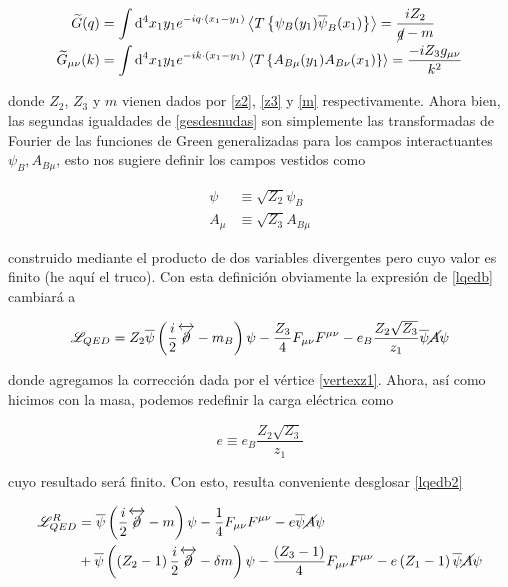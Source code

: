 \documentclass[tickz]{article}
\numberwithin{equation}{section}
\begin{document}
\begin{equation}\label{gesdesnudas}
\begin{aligned}
\widetilde{G}(q) &=\int \mathrm{d^4}x_1y_1 e^{-iq\cdot( x_1 - y_1)}\left\langle T\left\{ \psi_B(y_1)\overline{\psi}_B(x_1)\right\} \right\rangle = \frac{iZ_2}{\cancel{q}-m}\\
 \widetilde{G}_{\mu\nu}(k)&=\int \mathrm{d^4}x_1y_1 e^{-ik\cdot( x_1 - y_1)}\left\langle T\left\{ A_{B\mu}(y_1)A_{B\nu}(x_1)\right\}\right\rangle =\frac{-iZ_3g_{\mu\nu}}{k^2}
\end{aligned}
\end{equation}

donde $ Z_2 $, $ Z_3 $ y $ m $ vienen dados por \ref{z2}, \ref{z3} y \ref{m} respectivamente. Ahora bien, las segundas igualdades de \ref{gesdesnudas} son simplemente las transformadas de Fourier de las funciones de Green generalizadas para los campos interactuantes $ \psi_B, A_{B\mu} $, esto nos sugiere definir los campos vestidos como

\begin{equation}\label{key}
\begin{aligned}
\psi &\equiv \sqrt{Z_2}\psi_B\\
A_{\mu} &\equiv \sqrt{Z_3} A_{B\mu}
\end{aligned}
\end{equation}

construido mediante el producto de dos variables divergentes pero cuyo valor es finito (he aquí el truco). Con esta definición obviamente la expresión de \ref{lqedb} cambiará a 

\begin{equation}\label{lqedb2}
\mathscr{L}_{QED}=Z_2\overline{\psi}\left(\frac{i}{2}
\overleftrightarrow{\cancel{\partial}}-m_B\right)\psi-\frac{Z_3}{4}F_{ \mu\nu}F^{\mu\nu}-e_B\frac{Z_2 \sqrt{Z_3}}{z_1}\overline{\psi}\cancel{A}\psi
\end{equation}

donde agregamos la corrección dada por el vértice \ref{vertexz1}. Ahora, así como hicimos con la masa, podemos redefinir la carga eléctrica como

\begin{equation}\label{key}
e \equiv e_B\frac{Z_2 \sqrt{Z_3}}{z_1}
\end{equation}

cuyo resultado será finito. Con esto, resulta conveniente desglosar \ref{lqedb2}

\begin{equation}\label{lqedr}
\begin{aligned}
\mathscr{L}^{R}_{QED}&=\overline{\psi}\left(\frac{i}{2}
\overleftrightarrow{\cancel{\partial}}-m\right)\psi-\frac{1}{4}F_{ \mu\nu}F^{\mu\nu}-e\overline{\psi}\cancel{A}\psi\\
&+ \overline{\psi}\left( \left(Z_2 - 1\right)\frac{i}{2}\overleftrightarrow{\cancel{\partial}}-\delta m\right)\psi -\frac{\left(Z_3 -1\right)}{4}F_{ \mu\nu}F^{\mu\nu} - e\left(Z_1-1\right)\overline{\psi}\cancel{A}\psi
\end{aligned}
\end{equation}
\end{document}
